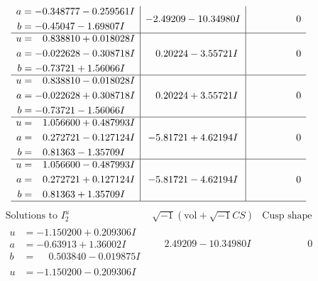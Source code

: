 \documentclass[1p]{elsarticle_modified}
\theoremstyle{definition}
\newcommand{\I}{\sqrt{-1}}
\begin{document}
$$\begin{array}{c|c|c}
\begin{aligned}
a &= -0.348777 - 0.259561 I \\
b &= -0.45047 - 1.69807 I\end{aligned}
 & -2.49209 - 10.34980 I & \phantom{-0.000000 } 0 \\ \hline\begin{aligned}
u &= \phantom{-}0.838810 + 0.018028 I \\
a &= -0.022628 - 0.308718 I \\
b &= -0.73721 + 1.56066 I\end{aligned}
 & \phantom{-}0.20224 - 3.55721 I & \phantom{-0.000000 } 0 \\ \hline\begin{aligned}
u &= \phantom{-}0.838810 - 0.018028 I \\
a &= -0.022628 + 0.308718 I \\
b &= -0.73721 - 1.56066 I\end{aligned}
 & \phantom{-}0.20224 + 3.55721 I & \phantom{-0.000000 } 0 \\ \hline\begin{aligned}
u &= \phantom{-}1.056600 + 0.487993 I \\
a &= \phantom{-}0.272721 - 0.127124 I \\
b &= \phantom{-}0.81363 - 1.35709 I\end{aligned}
 & -5.81721 + 4.62194 I & \phantom{-0.000000 } 0 \\ \hline\begin{aligned}
u &= \phantom{-}1.056600 - 0.487993 I \\
a &= \phantom{-}0.272721 + 0.127124 I \\
b &= \phantom{-}0.81363 + 1.35709 I\end{aligned}
 & -5.81721 - 4.62194 I & \phantom{-0.000000 } 0\\
 \hline 
 \end{array}$$\newpage$$\begin{array}{c|c|c}  
\text{Solutions to }I^u_{2}& \I (\text{vol} + \sqrt{-1}CS) & \text{Cusp shape}\\
 \hline 
\begin{aligned}
u &= -1.150200 + 0.209306 I \\
a &= -0.63913 + 1.36002 I \\
b &= \phantom{-}0.503840 - 0.019875 I\end{aligned}
 & \phantom{-}2.49209 - 10.34980 I & \phantom{-0.000000 } 0 \\ \hline\begin{aligned}
u &= -1.150200 - 0.209306 I \\

\end{aligned}
\end{array}$$
\end{document}
